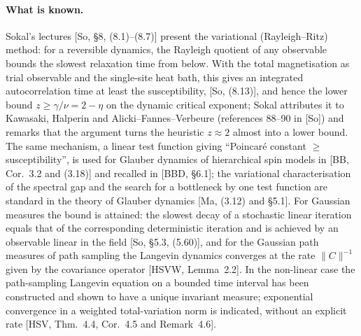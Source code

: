 \documentclass[11pt,a4paper]{article}
\theoremstyle{definition}
\theoremstyle{remark}
\begin{document}
\paragraph{What is known.}
Sokal's lectures [So, \S8, (8.1)--(8.7)] present the variational (Rayleigh--Ritz) method: for a reversible dynamics, the Rayleigh quotient of any observable bounds the slowest relaxation time from below.
With the total magnetisation as trial observable and the single-site heat bath, this gives an integrated autocorrelation time at least the susceptibility, [So, (8.13)], and hence the lower bound $z\ge\gamma/\nu=2-\eta$ on the dynamic critical exponent; Sokal attributes it to Kawasaki, Halperin and Alicki--Fannes--Verbeure (references 88--90 in [So]) and remarks that the argument turns the heuristic $z\approx2$ almost into a lower bound.
The same mechanism, a linear test function giving ``Poincar\'e constant $\ge$ susceptibility'', is used for Glauber dynamics of hierarchical spin models in [BB, Cor.~3.2 and (3.18)] and recalled in [BBD, \S6.1]; the variational characterisation of the spectral gap and the search for a bottleneck by one test function are standard in the theory of Glauber dynamics [Ma, (3.12) and \S5.1].
For Gaussian measures the bound is attained: the slowest decay of a stochastic linear iteration equals that of the corresponding deterministic iteration and is achieved by an observable linear in the field [So, \S5.3, (5.60)], and for the Gaussian path measures of path sampling the Langevin dynamics converges at the rate $\|C\|^{-1}$ given by the covariance operator [HSVW, Lemma~2.2].
In the non-linear case the path-sampling Langevin equation on a bounded time interval has been constructed and shown to have a unique invariant measure; exponential convergence in a weighted total-variation norm is indicated, without an explicit rate [HSV, Thm.~4.4, Cor.~4.5 and Remark~4.6].
\end{document}
